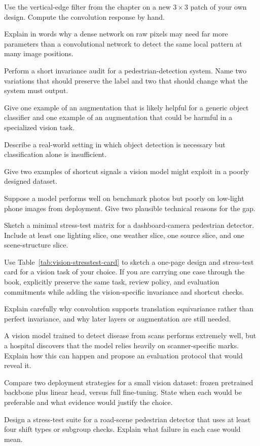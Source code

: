 \begin{exercises}
\item Use the vertical-edge filter from the chapter on a new $3 \times 3$ patch of your own design. Compute the convolution response by hand.
\item Explain in words why a dense network on raw pixels may need far more parameters than a convolutional network to detect the same local pattern at many image positions.
\item Perform a short invariance audit for a pedestrian-detection system. Name two variations that should preserve the label and two that should change what the system must output.
\item Give one example of an augmentation that is likely helpful for a generic object classifier and one example of an augmentation that could be harmful in a specialized vision task.
\item Describe a real-world setting in which object detection is necessary but classification alone is insufficient.
\item Give two examples of shortcut signals a vision model might exploit in a poorly designed dataset.
\item Suppose a model performs well on benchmark photos but poorly on low-light phone images from deployment. Give two plausible technical reasons for the gap.
\item Sketch a minimal stress-test matrix for a dashboard-camera pedestrian detector. Include at least one lighting slice, one weather slice, one source slice, and one scene-structure slice.
\item Use Table~\ref{tab:vision-stresstest-card} to sketch a one-page design and stress-test card for a vision task of your choice. If you are carrying one case through the book, explicitly preserve the same task, review policy, and evaluation commitments while adding the vision-specific invariance and shortcut checks.
\end{exercises}

\begin{challengeexercises}
\item Explain carefully why convolution supports translation equivariance rather than perfect invariance, and why later layers or augmentation are still needed.
\item A vision model trained to detect disease from scans performs extremely well, but a hospital discovers that the model relies heavily on scanner-specific marks. Explain how this can happen and propose an evaluation protocol that would reveal it.
\item Compare two deployment strategies for a small vision dataset: frozen pretrained backbone plus linear head, versus full fine-tuning. State when each would be preferable and what evidence would justify the choice.
\item Design a stress-test suite for a road-scene pedestrian detector that uses at least four shift types or subgroup checks. Explain what failure in each case would mean.
\end{challengeexercises}

